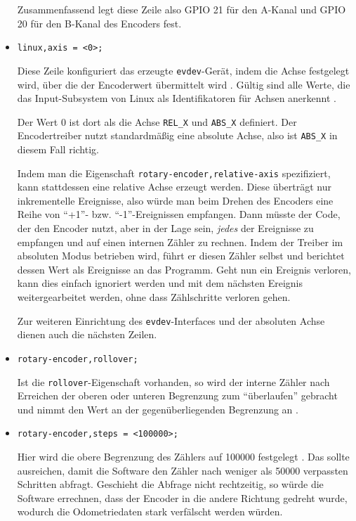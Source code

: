 \documentclass[german]{thesis_KBS}
\newcommand{\code}[1]{\texttt{#1}}  %
\begin{document}
\begin{itemize}
    Zusammenfassend legt diese Zeile also GPIO 21 für den A-Kanal und GPIO 20
    für den B-Kanal des Encoders fest.

    \item \code{linux,axis = <0>;}

    Diese Zeile konfiguriert das erzeugte \code{evdev}-Gerät, indem die Achse
    festgelegt wird, über die der Encoderwert übermittelt wird
    \cite{devicetree-rotary}. Gültig sind alle Werte, die das Input-Subsystem
    von Linux als Identifikatoren für Achsen anerkennt \cite{input-event-codes}.

    Der Wert 0 ist dort als die Achse \code{REL\_X} und \code{ABS\_X} definiert.
    Der Encodertreiber nutzt standardmäßig eine absolute Achse, also ist
    \code{ABS\_X} in diesem Fall richtig.

    Indem man die Eigenschaft \code{rotary-encoder,relative-axis} spezifiziert,
    kann stattdessen eine relative Achse erzeugt werden. Diese überträgt nur
    inkrementelle Ereignisse, also würde man beim Drehen des Encoders eine Reihe
    von "`+1"'- bzw. "`-1"'-Ereignissen empfangen. Dann müsste der Code, der den
    Encoder nutzt, aber in der Lage sein, \emph{jedes} der Ereignisse zu
    empfangen und auf einen internen Zähler zu rechnen. Indem der Treiber im
    absoluten Modus betrieben wird, führt er diesen Zähler selbst und berichtet
    dessen Wert als Ereignisse an das Programm. Geht nun ein Ereignis verloren,
    kann dies einfach ignoriert werden und mit dem nächsten Ereignis
    weitergearbeitet werden, ohne dass Zählschritte verloren gehen.

    Zur weiteren Einrichtung des \code{evdev}-Interfaces und der absoluten Achse
    dienen auch die nächsten Zeilen.

    \item \code{rotary-encoder,rollover;}

    Ist die \code{rollover}-Eigenschaft vorhanden, so wird der interne Zähler
    nach Erreichen der oberen oder unteren Begrenzung zum "`überlaufen"'
    gebracht und nimmt den Wert an der gegenüberliegenden Begrenzung an
    \cite{devicetree-rotary}.

    \item \code{rotary-encoder,steps = <100000>;}

    Hier wird die obere Begrenzung des Zählers auf 100000 festgelegt
    \cite{devicetree-rotary}. Das sollte ausreichen, damit die Software den
    Zähler nach weniger als 50000 verpassten Schritten abfragt. Geschieht die
    Abfrage nicht rechtzeitig, so würde die Software errechnen, dass der Encoder
    in die andere Richtung gedreht wurde, wodurch die Odometriedaten stark
    verfälscht werden würden.

\end{itemize}
\end{document}
